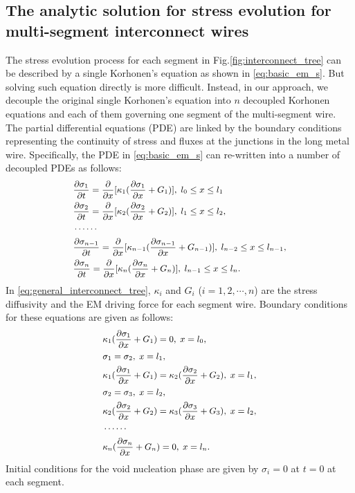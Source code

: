 \subsection{The analytic solution for stress evolution for multi-segment interconnect wires}
The stress evolution process for each segment in
Fig.\ref{fig:interconnect_tree} can be described by a single
Korhonen's equation as shown in \eqref{eq:basic_em_s}. But solving
such equation directly is more difficult.  Instead, in our approach,
we decouple the original single Korhonen's equation into $n$ decoupled
Korhonen equations and each of them governing one segment of the
multi-segment wire. The partial differential equations (PDE) are
linked by the boundary conditions representing the continuity of
stress and fluxes at the junctions in the long metal
wire. Specifically, the PDE in \eqref{eq:basic_em_s} can re-written
into a number of decoupled PDEs as follows:
\begin{equation} \label{eq:general_interconnect_tree}\small
\begin{split}
&\frac{\partial \sigma_1}{\partial t}=\frac{\partial }{\partial
x}[\kappa_1(\frac{\partial \sigma_1}{\partial x}+G_1)],\;l_0\leq x \leq l_1 \\
&\frac{\partial \sigma_2}{\partial t}=\frac{\partial }{\partial
x}[\kappa_2(\frac{\partial \sigma_2}{\partial
x}+G_2)],\;l_1\leq x \leq l_2, \\
&\cdots\cdots\\
&\frac{\partial \sigma_{n-1}}{\partial t}=\frac{\partial }{\partial
x}[\kappa_{n-1}(\frac{\partial \sigma_{n-1}}{\partial
x}+G_{n-1})],\;l_{n-2}\leq x \leq l_{n-1}, \\
&\frac{\partial \sigma_{n}}{\partial t}=\frac{\partial }{\partial
x}[\kappa_{n}(\frac{\partial \sigma_{n}}{\partial
x}+G_{n})],\;l_{n-1}\leq x \leq l_n.
 \end{split}
 \end{equation}
 In \eqref{eq:general_interconnect_tree}, $\kappa_{i}$ and $G_i$
 ($i=1,2,\cdots,n$) are the stress diffusivity and the EM driving
 force for each segment wire. Boundary conditions for these equations
 are given as follows:
 \begin{equation} \label{bc:general_interconnect_tree}\small
\begin{split}
&\kappa_1(\frac{\partial \sigma_1}{\partial x}+G_1)=0,\;x=l_0,\\
&\sigma_1=\sigma_2,\;x=l_1,\\
&\kappa_1(\frac{\partial \sigma_1}{\partial
x}+G_1)=\kappa_2(\frac{\partial \sigma_2}{\partial
x}+G_2),\;x=l_1,\\
&\sigma_2=\sigma_3,\;x=l_2,\\
&\kappa_2(\frac{\partial \sigma_2}{\partial
x}+G_2)=\kappa_3(\frac{\partial \sigma_3}{\partial
x}+G_3),\;x=l_2,\\
&\cdots\cdots \\
&\kappa_n(\frac{\partial \sigma_n}{\partial
x}+G_n)=0,\;x=l_n.
 \end{split}
 \end{equation}
 Initial conditions for the void nucleation phase are given by
 $\sigma_i=0$ at $t=0$ at each segment.

